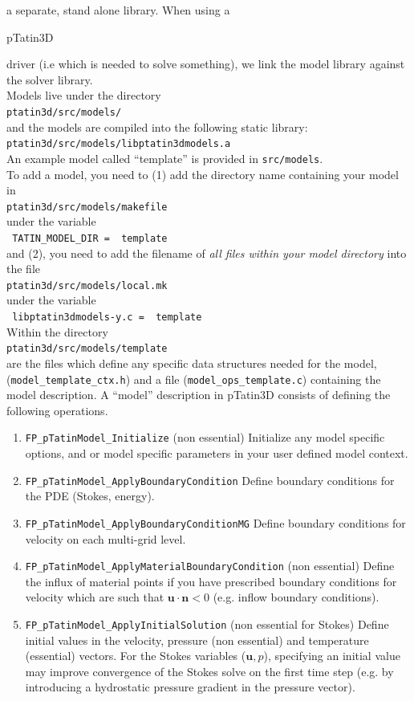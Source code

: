 \documentclass[paper=a4, fontsize=11pt,twoside]{scrartcl}
\newcommand{\ptat}{{{\sc pTatin3D}}}
\newcommand{\shellcmd}[1]{\\\indent\indent\texttt{\hspace{5mm}\footnotesize #1}\\}
\newcommand{\unix}[1]{\texttt{\footnotesize #1}}
\begin{document}
a separate, stand alone library. When using a {\ptat{ driver (i.e which is needed to solve something),
we link the model library against the solver library.
\\[8pt]
Models live under the directory
	\shellcmd{ptatin3d/src/models/}
and the models are compiled into the following static library:
	\shellcmd{ptatin3d/src/models/libptatin3dmodels.a}
An example model called ``template'' is provided in \unix{src/models}.
\\[8pt]
To add a model, you need to (1) add the directory name containing your model in
	\shellcmd{ptatin3d/src/models/makefile}
under the variable
	\shellcmd{
	TATIN\_MODEL\_DIR = \
        template
	}
and (2), you need to add the filename of \textit{all files within your model directory} into the file
	\shellcmd{ptatin3d/src/models/local.mk}
under the variable
	\shellcmd{
	libptatin3dmodels-y.c = \
        template
	}
Within the directory
	\shellcmd{ptatin3d/src/models/template}
are the files which define any specific data structures needed for the model,
	(\unix{model\_template\_ctx.h})
and a file (\unix{model\_ops\_template.c}) containing the model description.
A ``model'' description in {\ptat} consists of defining the following operations.
\begin{enumerate}
	\item \unix{FP\_pTatinModel\_Initialize} (non essential)
	Initialize any model specific options, and or model specific parameters in your user defined model context.

	\item \unix{FP\_pTatinModel\_ApplyBoundaryCondition}
	Define boundary conditions for the PDE (Stokes, energy).

	\item \unix{FP\_pTatinModel\_ApplyBoundaryConditionMG}
	Define boundary conditions for velocity on each multi-grid level.

	\item \unix{FP\_pTatinModel\_ApplyMaterialBoundaryCondition} (non essential)
	Define the influx of material points if you have prescribed boundary conditions for velocity which are such that $\boldsymbol u \cdot \boldsymbol n < 0$ (e.g. inflow boundary conditions).

	\item \unix{FP\_pTatinModel\_ApplyInitialSolution} (non essential for Stokes)
	Define initial values in the velocity, pressure (non essential) and temperature (essential) vectors. For the Stokes variables ($\boldsymbol u,p$), specifying an initial value may improve convergence of the Stokes solve on the first time step (e.g. by introducing a hydrostatic pressure gradient in the pressure vector).
	

\end{enumerate}}}
\end{document}
